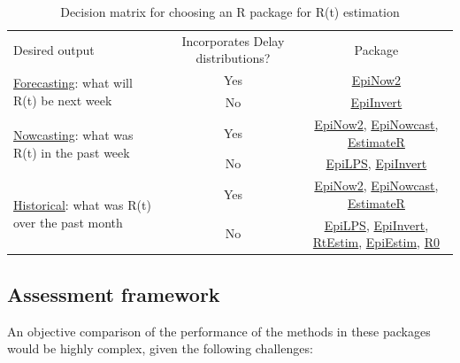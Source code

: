 \documentclass[
  letterpaper,
  DIV=11,
  numbers=noendperiod]{scrreprt}
\begin{document}
\begin{longtable}[]{@{}lcc@{}}
\caption{Decision matrix for choosing an R package for R(t)
estimation}\tabularnewline
\toprule\noalign{}
\endfirsthead
\endhead
\bottomrule\noalign{}
\endlastfoot
Desired output & Incorporates Delay distributions? & Package \\
\multirow{2}{=}{\ul{Forecasting}: what will R(t) be next week} & Yes &
\href{package_EpiNow2.html}{EpiNow2} \\
& No & \href{package_EpiInvert.html}{EpiInvert} \\
\multirow{2}{=}{\ul{Nowcasting}: what was R(t) in the past week} & Yes &
\textquotesingle{} \href{package_EpiNow2.html}{EpiNow2},
\href{package_epinowcast.html}{EpiNowcast},
\href{package_EstimateR.html}{EstimateR} \\
& No & \href{package_EpiLPS.html}{EpiLPS},
\href{package_EpiInvert.html}{EpiInvert} \\
\multirow{2}{=}{\ul{Historical}: what was R(t) over the past month} &
Yes & \href{package_EpiNow2.html}{EpiNow2},
\href{package_epinowcast.html}{EpiNowcast},
\href{package_EstimateR.html}{EstimateR} \\
& No & \href{package_EpiLPS.html}{EpiLPS},
\href{package_EpiInvert.html}{EpiInvert},
\href{package_RtEstim.html}{RtEstim},
\href{package_EpiEstim.html}{EpiEstim}, \href{package_R0.html}{R0} \\
\end{longtable}

\subsection*{Assessment framework}\label{sec-assessment}

An objective comparison of the performance of the methods in these
packages would be highly complex, given the following challenges:
\end{document}
